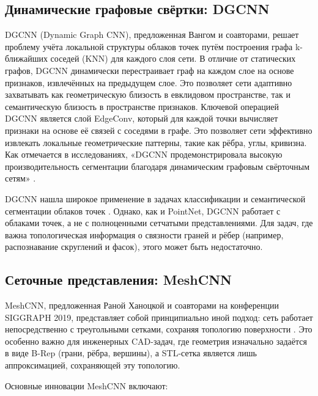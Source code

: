 \subsection{Динамические графовые свёртки: DGCNN}

DGCNN (Dynamic Graph CNN), предложенная Вангом и соавторами, решает проблему учёта локальной структуры облаков точек путём построения графа k-ближайших соседей (KNN) для каждого слоя сети. В отличие от статических графов, DGCNN динамически перестраивает граф на каждом слое на основе признаков, извлечённых на предыдущем слое. Это позволяет сети адаптивно захватывать как геометрическую близость в евклидовом пространстве, так и семантическую близость в пространстве признаков. Ключевой операцией DGCNN является слой EdgeConv, который для каждой точки вычисляет признаки на основе её связей с соседями в графе. Это позволяет сети эффективно извлекать локальные геометрические паттерны, такие как рёбра, углы, кривизна. Как отмечается в исследованиях, «DGCNN продемонстрировала высокую производительность сегментации благодаря динамическим графовым свёрточным сетям» \cite{bai2020}.

DGCNN нашла широкое применение в задачах классификации и семантической сегментации облаков точек \cite{hao2022}. Однако, как и PointNet, DGCNN работает с облаками точек, а не с полноценными сетчатыми представлениями. Для задач, где важна топологическая информация о связности граней и рёбер (например, распознавание скруглений и фасок), этого может быть недостаточно.

\subsection{Сеточные представления: MeshCNN}

MeshCNN, предложенная Раной Ханоцкой и соавторами на конференции SIGGRAPH 2019, представляет собой принципиально иной подход: сеть работает непосредственно с треугольными сетками, сохраняя топологию поверхности \cite{meshcnn2019}. Это особенно важно для инженерных CAD-задач, где геометрия изначально задаётся в виде B-Rep (грани, рёбра, вершины), а STL-сетка является лишь аппроксимацией, сохраняющей эту топологию.

Основные инновации MeshCNN включают:

